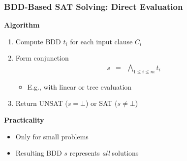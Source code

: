 \documentclass[t,pdf]{beamer}
\newcommand{\keyword}[1]{\textbf{#1}}
\newcommand{\keyif}{\keyword{if}}
\newcommand{\keywhile}{\keyword{while}}
\newcommand{\keyfor}{\keyword{for}}
\newcommand{\keyreturn}{\keyword{return}}
\newcommand{\assign}{\ensuremath{\longleftarrow}}
\begin{document}
\begin{frame}

  \frametitle{BDD-Based SAT Solving: Direct Evaluation}



{\bf Algorithm}
\begin{enumerate}
\item    Compute BDD $t_i$ for each input clause $C_i$ 
\item    Form conjunction
  \begin{eqnarray*}
    s & = & \bigwedge_{1 \leq i \leq m} t_i
  \end{eqnarray*}
  \begin{itemize}
    \item E.g., with linear or tree evaluation
  \end{itemize}
\item Return UNSAT ($s = \bot$) or SAT ($s \not = \bot$)
\end{enumerate}


{\bf Practicality}

  \begin{itemize}
  \item Only  for small problems
  \item Resulting BDD $s$ represents {\em all} solutions
  \end{itemize}

\end{frame}
\end{document}
